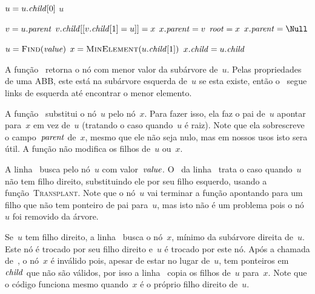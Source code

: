 \documentclass[../../main.tex]{subfiles}
\begin{document}
\begin{algorithm}
\begin{algorithmic}[1]

		\State $u = u.\mathit{child}[0]$
	\EndWhile
	\State \Return $u$
\EndFunction

	\State $v = u.\mathit{parent}$
		\State $v.\mathit{child}[[v.\mathit{child}[1] = u]] = x$
		\State $x.\mathit{parent} = v$
	\Else
		\State $\mathit{root} = x$
		\State $x.\parent = \Null$
	\EndIf
\EndFunction

	\State $u = \Call{Find}{\val}$ \label{line:rmabb:findb}
	 \label{line:rmabb:if1}
		\State {}
	\Else
		\State $x = \Call{MinElement}{u.\child[1]}$ \label{line:rmabb:minb}
		\State {}
		\State {}
		\State $x.\mathit{child} = u.\mathit{child}$ \label{line:rmabb:cpchild}
	\EndIf
\EndFunction

\end{algorithmic}
\end{algorithm}

A função~ retorna o nó com menor valor da subárvore de~$u$. Pelas propriedades de uma ABB, este está na subárvore esquerda de~$u$ se esta existe, então o~ segue links de esquerda até encontrar o menor elemento.

A função~ substitui o nó~$u$ pelo nó~$x$. Para fazer isso, ela faz o pai de~$u$ apontar para~$x$ em vez de~$u$ (tratando o caso quando~$u$ é raiz). Note que ela sobrescreve o campo~$\mathit{parent}$ de~$x$, mesmo que ele não seja nulo, mas em nossos usos isto sera útil. A função não modifica os filhos de~$u$ ou~$x$.

A linha~ busca pelo nó~$u$ com valor~$\mathit{value}$. O~ da linha~ trata o caso quando~$u$ não tem filho direito, substituindo ele por seu filho esquerdo, usando a função~\textsc{Transplant}. Note que o nó~$u$ vai terminar a função apontando para um filho que não tem ponteiro de pai para~$u$, mas isto não é um problema pois o nó~$u$ foi removido da árvore.

Se~$u$ tem filho direito, a linha~ busca o nó~$x$, mínimo da subárvore direita de~$u$. Este nó é trocado por seu filho direito e~$u$ é trocado por este nó. Após a chamada de~, o nó~$x$ é inválido pois, apesar de estar no lugar de~$u$, tem ponteiros em~$\mathit{child}$ que não são válidos, por isso a linha~ copia os filhos de~$u$ para~$x$. Note que o código funciona mesmo quando~$x$ é o próprio filho direito de~$u$.
\end{document}

